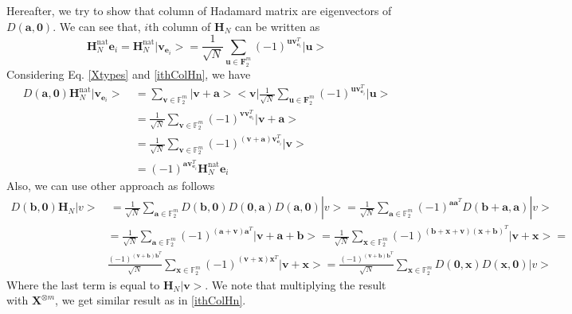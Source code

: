\documentclass{article}
\begin{document}
	Hereafter, we try to show that column of Hadamard matrix are eigenvectors of $D\left(\mathbf{a,0}\right)$. We can see that, $i$th column of $\mathbf{H}_N$ can be written as 
	\begin{equation}\label{ithColHn}
		\mathbf{H}_N^{\text{nat}} \mathbf{e}_i = \mathbf{H}_N^{\text{nat}} | \mathbf{v}_{\mathbf{e}_i}> = \frac{1}{\sqrt{N}} \sum_{\mathbf{u} \in \mathbf{F}_2^m}{\left(-1\right)^{\mathbf{u} \mathbf{v}_{\mathbf{e}_i}^T } |\mathbf{u}>}
	\end{equation}
	Considering Eq. \eqref{Xtypes} and \eqref{ithColHn}, we have
\begin{align*}
	D\left(\mathbf{a}, \mathbf{0} \right) \mathbf{H}_N^{\text{nat}} | \mathbf{v}_{\mathbf{e}_i} > \: & = \sum_{\mathbf{v} \in \mathbb{F}_2^m}{|\mathbf{v+a}><\mathbf{v}|}  \frac{1}{\sqrt{N}} \sum_{\mathbf{u} \in \mathbf{F}_2^m}{\left(-1\right)^{\mathbf{u} \mathbf{v}_{\mathbf{e}_i}^T } |\mathbf{u} > } \\
	& = \frac{1}{\sqrt{N}} \sum_{\mathbf{v} \in \mathbb{F}_2^m}{(-1)^{\mathbf{v}\mathbf{v}_{\mathbf{e}_i}^T } |\mathbf{v+a}>} \\
	& = \frac{1}{\sqrt{N}} \sum_{\mathbf{v} \in \mathbb{F}_2^m}{(-1)^{\left(\mathbf{v+a}\right)\mathbf{v}_{\mathbf{e}_i}^T } |\mathbf{v}>}\\
	& = (-1)^{\mathbf{a}\mathbf{v}_{\mathbf{e}_i}^T} \mathbf{H}_N^{\text{nat}} \mathbf{e}_i
\end{align*} 
		Also, we can use other approach as follows
	\begin{align*}
		D\left(\mathbf{b},\mathbf{0}\right) \mathbf{H}_N |v>& \: = \frac{1}{\sqrt{N}}\sum_{\mathbf{a} \in \mathbb{F}_2^m}{D\left(\mathbf{b},\mathbf{0}\right) D\left(\mathbf{0},\mathbf{a}\right) D\left(\mathbf{a},\mathbf{0}\right)}|v> = \frac{1}{\sqrt{N}}\sum_{\mathbf{a} \in \mathbb{F}_2^m}{(-1)^{\mathbf{a}\mathbf{a}^T} D\left(\mathbf{b}+\mathbf{a},\mathbf{a}\right)}|v> \\
		& = \frac{1}{\sqrt{N}}\sum_{\mathbf{a} \in \mathbb{F}_2^m}{(-1)^{(\mathbf{a+v})\mathbf{a}^T} | \mathbf{v}+\mathbf{a}+\mathbf{b}>}=\frac{1}{\sqrt{N}}\sum_{\mathbf{x} \in \mathbb{F}_2^m}{(-1)^{(\mathbf{b+x+v})(\mathbf{x+b})^T} | \mathbf{v}+\mathbf{x}>}= \\
		&\frac{(-1)^{(\mathbf{v+b})
				\mathbf{b}^T }}{\sqrt{N}}\sum_{\mathbf{x} \in \mathbb{F}_2^m}{(-1)^{(\mathbf{v+x})\mathbf{x}^T} | \mathbf{v}+\mathbf{x}>}=\frac{(-1)^{(\mathbf{v+b})
				\mathbf{b}^T }}{\sqrt{N}}\sum_{\mathbf{x} \in \mathbb{F}_2^m}{D(\mathbf{0, x}) D(\mathbf{x, 0})}|v>
	\end{align*}
	Where the last term is equal to $\mathbf{H}_N | \mathbf{v}>$. We note that multiplying the result with $\mathbf{X}^{\otimes m}$, we get similar result as in \eqref{ithColHn}.
\end{document}
